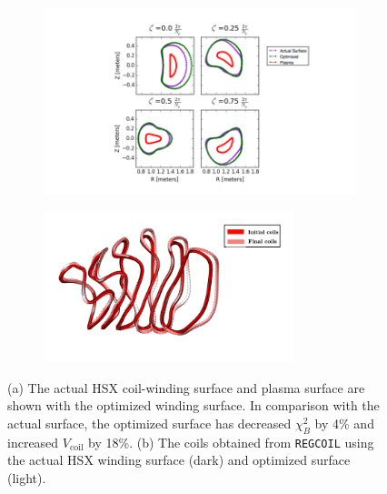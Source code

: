 \documentclass[aps,unsortedaddress]{revtex4-1}
\begin{document}
\begin{figure}
\begin{subfigure}[b]{0.8\textwidth}
\includegraphics[width=1\textwidth]{hsx_opt_surf.png}
\caption{}
\end{subfigure}
\begin{subfigure}[b]{0.8\textwidth}
\includegraphics[width=0.8\textwidth]{hsx_opt_coils.png}
\caption{}
\end{subfigure}
\caption{(a) The actual HSX coil-winding surface and plasma surface are shown with the optimized winding surface. In comparison with the actual surface, the optimized surface has decreased $\chi^2_B$ by 4\% and increased $V_{\text{coil}}$ by 18\%. (b) The coils obtained from \texttt{REGCOIL} using the actual HSX winding surface (dark) and optimized surface (light).}
\label{fig_hsx}
\end{figure}
\end{document}
